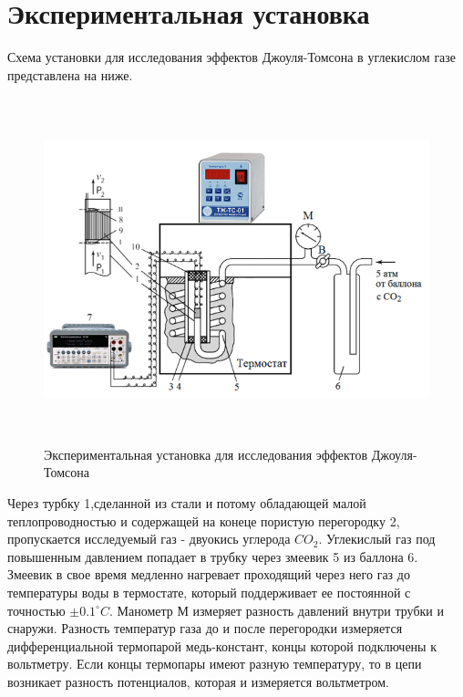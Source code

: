 \section*{Экспериментальная установка}
Схема установки для исследования эффектов Джоуля-Томсона в углекислом газе 
представлена на ниже.\\
\begin{figure}[h!]\label{fig:setup}
    \centering
    \includegraphics[width=15cm,height=10cm]{установка.png}
    \caption{Экспериментальная установка для исследования эффектов Джоуля-Томсона}
\end{figure}

\indent
Через турбку 1,сделанной из стали и потому обладающей малой теплопроводностью и
содержащей на конеце пористую перегородку 2, пропускается исследуемый 
газ - двуокись углерода $CO_2$. Углекислый газ под повышенным давлением
попадает в трубку через змеевик 5 из баллона 6. Змеевик в свое время 
медленно нагревает проходящий через него газ до температуры воды в термостате, 
который поддерживает ее постоянной с точностью $\pm 0.1^{\circ}C$. 
Манометр М измеряет разность давлений внутри трубки и снаружи. 
Разность температур газа до и после перегородки измеряется дифференциальной 
термопарой медь-констант, концы которой подключены к вольтметру. Если концы 
термопары имеют разную температуру, то в цепи возникает разность потенциалов, 
которая и измеряется вольтметром.




